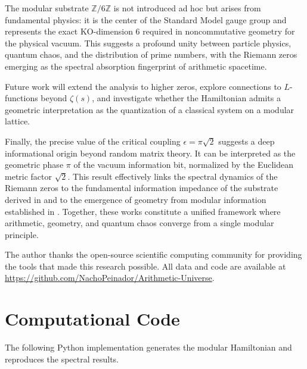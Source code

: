 \documentclass[prl,aps,floatfix,superscriptaddress,10pt]{revtex4-2}
\newcommand{\Zmod}{\mathbb{Z}/6\mathbb{Z}}
\begin{document}
The modular substrate $\Zmod$ is not introduced ad hoc but arises from fundamental physics: it is the center of the Standard Model gauge group and represents the exact KO-dimension 6 required in noncommutative geometry for the physical vacuum. This suggests a profound unity between particle physics, quantum chaos, and the distribution of prime numbers, with the Riemann zeros emerging as the spectral absorption fingerprint of arithmetic spacetime.

Future work will extend the analysis to higher zeros, explore connections to $L$-functions beyond $\zeta(s)$, and investigate whether the Hamiltonian admits a geometric interpretation as the quantization of a classical system on a modular lattice.

Finally, the precise value of the critical coupling $\epsilon = \pi\sqrt{2}$ suggests a deep informational origin beyond random matrix theory. It can be interpreted as the geometric phase $\pi$ of the vacuum information bit, normalized by the Euclidean metric factor $\sqrt{2}$. This result effectively links the spectral dynamics of the Riemann zeros to the fundamental information impedance of the substrate derived in \cite{PeinadorGenesis} and to the emergence of geometry from modular information established in \cite{PeinadorPi}. Together, these works constitute a unified framework where arithmetic, geometry, and quantum chaos converge from a single modular principle.

\begin{acknowledgments}
The author thanks the open-source scientific computing community for providing the tools that made this research possible.
All data and code are available at \url{https://github.com/NachoPeinador/Arithmetic-Universe}.
\end{acknowledgments}

\appendix

\section{Computational Code}

The following Python implementation generates the modular Hamiltonian and reproduces the spectral results.
\end{document}

